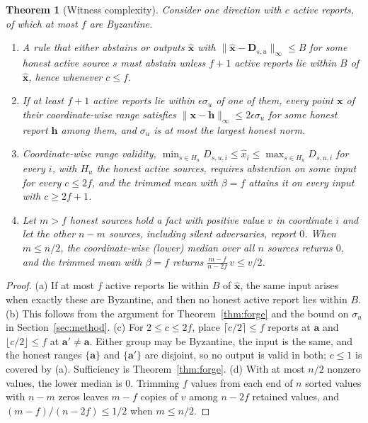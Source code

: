 \documentclass[journal]{IEEEtran}
\newtheorem{theorem}{Theorem}
\theoremstyle{remark}
\begin{document}
\begin{theorem}[Witness complexity]\label{thm:witness}
Consider one direction with $c$ active reports, of which at most $f$ are Byzantine.
\begin{enumerate}
\item[(a)] A rule that either abstains or outputs $\hat{\bm{x}}$ with $\|\hat{\bm{x}}-\bm{D}_{s,u}\|_\infty\le B$ for some honest \emph{active} source $s$ must abstain unless $f+1$ active reports lie within $B$ of $\hat{\bm{x}}$, hence whenever $c\le f$.
\item[(b)] If at least $f+1$ active reports lie within $\epsilon\sigma_u$ of one of them, every point $\bm{x}$ of their coordinate-wise range satisfies $\|\bm{x}-\bm{h}\|_\infty\le 2\epsilon\sigma_u$ for some honest report $\bm{h}$ among them, and $\sigma_u$ is at most the largest honest norm.
\item[(c)] Coordinate-wise range validity, $\min_{s\in H_u}D_{s,u,i}\le\hat{x}_i\le\max_{s\in H_u}D_{s,u,i}$ for every $i$, with $H_u$ the honest active sources, requires abstention on some input for every $c\le 2f$, and the trimmed mean with $\beta=f$ attains it on every input with $c\ge 2f+1$.
\item[(d)] Let $m>f$ honest sources hold a fact with positive value $v$ in coordinate $i$ and let the other $n-m$ sources, including silent adversaries, report $0$. When $m\le n/2$, the coordinate-wise (lower) median over all $n$ sources returns $0$, and the trimmed mean with $\beta=f$ returns $\frac{m-f}{n-2f}\,v\le v/2$.
\end{enumerate}
\end{theorem}
\begin{proof}
(a) If at most $f$ active reports lie within $B$ of $\hat{\bm{x}}$, the same input arises when exactly these are Byzantine, and then no honest active report lies within $B$. (b) This follows from the argument for Theorem~\ref{thm:forge} and the bound on $\sigma_u$ in Section~\ref{sec:method}. (c) For $2\le c\le 2f$, place $\lceil c/2\rceil\le f$ reports at $\bm{a}$ and $\lfloor c/2\rfloor\le f$ at $\bm{a}'\ne\bm{a}$. Either group may be Byzantine, the input is the same, and the honest ranges $\{\bm{a}\}$ and $\{\bm{a}'\}$ are disjoint, so no output is valid in both; $c\le 1$ is covered by (a). Sufficiency is Theorem~\ref{thm:forge}. (d) With at most $n/2$ nonzero values, the lower median is $0$. Trimming $f$ values from each end of $n$ sorted values with $n-m$ zeros leaves $m-f$ copies of $v$ among $n-2f$ retained values, and $(m-f)/(n-2f)\le 1/2$ when $m\le n/2$.
\end{proof}
\end{document}
